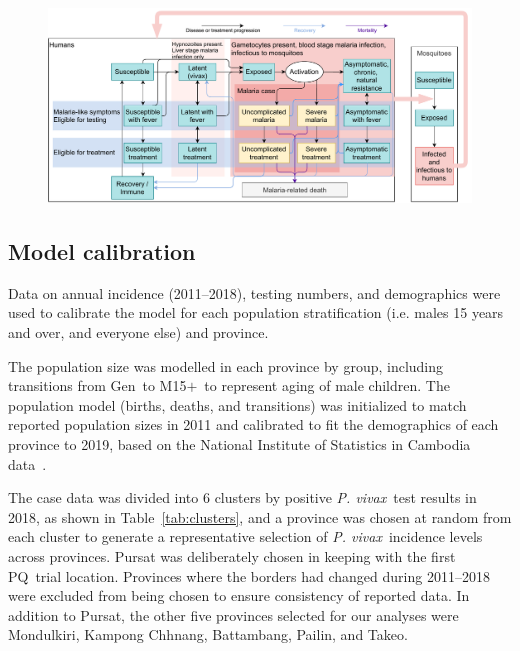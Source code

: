 \documentclass[doublespacing]{bmcart}
\newcommand{\pv}{\textit{P. vivax}}
\newcommand{\males}{M15$+$}
\newcommand{\gen}{Gen}
\newcommand{\pq}{PQ}
\begin{document}
\begin{figure}[h!]
\includegraphics[width=.95\linewidth]{Optima_Malaria_model_diagram.pdf}\caption{}\label{fig:model_flow}
\end{figure}


\subsection*{Model calibration} \label{sec:calibration} %

Data on annual incidence (2011--2018), testing numbers, and demographics were used to calibrate the model for each population stratification (i.e. males 15 years and over, and everyone else) and province. 

The population size was modelled in each province by group, including transitions from \gen~to \males~to represent aging of male children. The population model (births, deaths, and transitions) was initialized to match reported population sizes in 2011 and calibrated to fit the demographics of each province to 2019, based on the National Institute of Statistics in Cambodia data~\cite{NIS_Cambodia}.

The case data was divided into 6 clusters by positive \pv~test results in 2018, as shown in Table~\ref{tab:clusters}, and a province was chosen at random from each cluster to generate a representative selection of \pv~incidence levels across provinces. Pursat was deliberately chosen in keeping with the first \pq~trial location. Provinces where the borders had changed during 2011--2018 were excluded from being chosen to ensure consistency of reported data. In addition to Pursat, the other five provinces selected for our analyses were Mondulkiri, Kampong Chhnang, Battambang, Pailin, and Takeo. 
\end{document}
